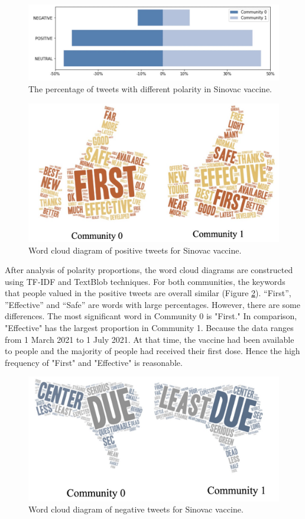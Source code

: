 \documentclass[sigplan,screen]{acmart}
\begin{document}
\begin{figure}[h]
  \centering
  \includegraphics[width=0.8\linewidth]{resource/yidan/sinovac_sentiment2.jpeg}
  \caption{The percentage of tweets with different polarity in Sinovac vaccine.}
  \label{fig:pola_sinovac}
\end{figure}

\begin{figure}[h]
  \centering
  \includegraphics[width=0.6\linewidth]{resource/yidan/Sinovac_wc_pos.jpeg}
  \caption{Word cloud diagram of positive tweets for Sinovac vaccine.}
  \label{fig:wc_pos_Sinovac}
\end{figure}

After analysis of polarity proportions, the word cloud diagrams are constructed using TF-IDF {\cite{tfidf}} and TextBlob{\cite{textblob}} techniques. For both communities, the keywords that people valued in the positive tweets are overall similar (Figure \ref{fig:wc_pos_Sinovac}). “First”, ”Effective” and “Safe” are words with large percentages. However, there are some differences. The most significant word in Community 0 is "First." In comparison, "Effective" has the largest proportion in Community 1. Because the data ranges from 1 March 2021 to 1 July 2021. At that time, the vaccine had been available to people and the majority of people had received their first dose. Hence the high frequency of "First" and "Effective" is reasonable.

\begin{figure}[h]
  \centering
  \includegraphics[width=0.6\linewidth]{resource/yidan/Sinovac_wc_neg.jpeg}
  \caption{Word cloud diagram of negative tweets for Sinovac vaccine.}
  \label{fig:wc_neg_Sinovac}
\end{figure}
\end{document}
